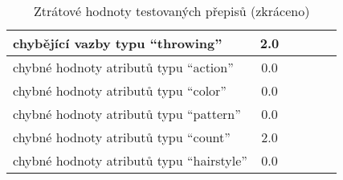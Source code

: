 \begin{table}[ht!]
\begin{tabular}{|l|c|c|c|c|c|}
		chybějící vazby typu \enquote{throwing}             & 2.0                                         &            &            &            &            \\
		\hline
		chybné hodnoty atributů typu \enquote{action}       & 0.0                                         &            &            &            &            \\
		chybné hodnoty atributů typu \enquote{color}        & 0.0                                         &            &            &            &            \\
		chybné hodnoty atributů typu \enquote{pattern}      & 0.0                                         &            &            &            &            \\
		chybné hodnoty atributů typu \enquote{count}        & 2.0                                         &            &            &            &            \\
		chybné hodnoty atributů typu \enquote{hairstyle}    & 0.0                                         &            &            &            &            \\
		\hline
	\end{tabular}
	\caption{Ztrátové hodnoty testovaných přepisů (zkráceno)}\label{tab:out_values}
\end{table}
